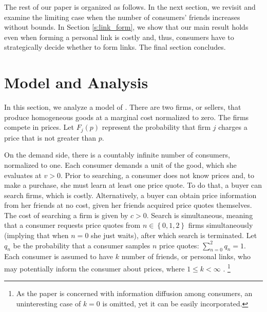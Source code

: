 \documentclass[12pt]{article}
\begin{document}
The rest of our paper is organized as follows.  In the next 
section, we revisit \cite{galeotti2004} and examine the limiting 
case when the number of consumers' friends increases without 
bounds.  In Section \ref{s:link_form}, we show that our main 
result holds even when forming a personal link is costly and, 
thus, consumers have to strategically decide whether to form 
links.  The final section concludes.

\section{Model and Analysis}\label{s:simultaneous}

In this section, we analyze a model of \cite{galeotti2004}.  
There are two firms, or sellers, that produce homogeneous goods 
at a marginal cost normalized to zero. The firms compete in 
prices.  Let $F_j(p)$ represent the probability that firm $j$ 
charges a price that is not greater than $p$. 

On the demand side, there is a countably infinite number of 
consumers, normalized to one.  Each consumer demands a unit of 
the good, which she evaluates at $v>0$. Prior to searching, a 
consumer does not know prices and, to make a purchase, she must 
learn at least one price quote.  To do that, a buyer can search 
firms, which is costly.   Alternatively, a buyer can obtain 
price information from her friends at no cost, given her friends 
acquired price quotes themselves.  The cost of searching a firm 
is given by $c>0$.  Search is simultaneous, meaning that a 
consumer requests price quotes from $n\in \left\{0,1,2\right\}$ 
firms simultaneously (implying that when $n=0$ she just waits), 
after which search is terminated.   Let $q_n$ be the probability 
that a consumer samples $n$ price quotes: 
$\sum_{n=0}^{2}q_n=1$.  Each consumer is assumed to have $k$ 
number of friends, or personal links, who may potentially inform 
the consumer about prices, where $1\leq k < \infty$ .%
\footnote{As the paper is concerned with information diffusion
	among consumers, an uninteresting case of $k=0$ is omitted, 
	yet it can be easily incorporated.}
\end{document}
